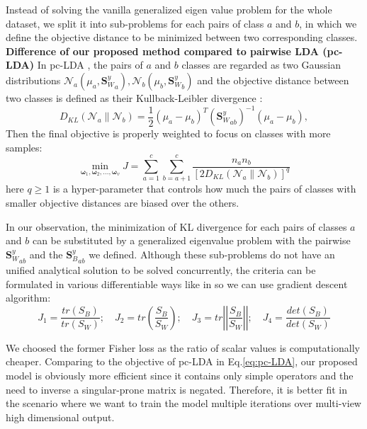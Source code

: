     Instead of solving the vanilla generalized eigen value problem for the whole dataset, we split it into sub-problems for each pairs of class $a$ and $b$, in which we define the objective distance to be minimized between two corresponding classes.
    \textbf{Difference of our proposed method compared to pairwise LDA (pc-LDA)}
    In pc-LDA \cite{kong2014pairwise}, the pairs of $a$ and $b$ classes are regarded as two Gaussian distributions $\mathcal{N}_a(\mu_a,{\boldsymbol{S}_W^y}_a), \mathcal{N}_b(\mu_b,{\boldsymbol{S}_W^y}_b)$ and the objective distance between two classes is defined as their Kullback-Leibler divergence \cite{kullback1951}:
    \begin{equation}
        D_{KL}\left(\mathcal{N}_a\parallel\mathcal{N}_b\right)=\frac{1}{2}\left(\mu_a-\mu_b\right)^{T}{\left({\boldsymbol{S}_W^y}_{ab}\right)}^{-1}\left(\mu_a-\mu_b\right),
    \end{equation}
    Then the final objective is properly weighted to focus on classes with more samples:
    \begin{equation}
        \operatorname*{min}_{\boldsymbol{\omega}_1, \boldsymbol{\omega}_2,...,
        \boldsymbol{\omega}_v}{J}=\sum_{a=1}^{c}\sum_{b=a+1}^{c}{\frac{n_an_b}{{[2D_{KL}\left(\mathcal{N}_a\parallel\mathcal{N}_b\right)]}^q}}
        \label{eq:pc-LDA}
    \end{equation}
    here $q\ge1$ is a hyper-parameter that controls how much the pairs of classes with smaller objective distances are biased over the others.

    In our observation, the minimization of KL divergence for each pairs of classes $a$ and $b$ can be substituted by a generalized eigenvalue problem with the pairwise ${\boldsymbol{S}_W^y}_{ab}$ and the ${\boldsymbol{S}_B^y}_{ab}$ we defined. Although these sub-problems do not have an unified analytical solution to be solved concurrently, the criteria can be formulated in various differentiable ways like in \cite{fukunaga1990441} so we can use gradient descent algorithm:
    \begin{equation}
        J_1=\frac{tr(S_B)}{tr(S_W)};\quad 
        J_2=tr\left(\frac{S_B}{S_W}\right);\quad
        J_3=tr\left|\left|\frac{S_B}{S_W}\right|\right|;\quad
        J_4=\frac{det(S_B)}{det(S_W)}
    \end{equation}

    We choosed the former Fisher loss as the ratio of scalar values is computationally cheaper. Comparing to the objective of pc-LDA in Eq.\eqref{eq:pc-LDA}, our proposed model is obviously more efficient since it contains only simple operators and the need to inverse a singular-prone matrix is negated. Therefore, it is better fit in the scenario where we want to train the model multiple iterations over multi-view high dimensional output.

